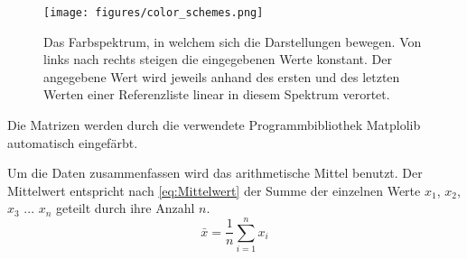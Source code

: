 \begin{figure}
    \centering
    \texttt{[image: figures/color\_schemes.png]}
    \caption{Das Farbspektrum, in welchem sich die Darstellungen bewegen. Von links nach rechts steigen die eingegebenen Werte konstant. Der angegebene Wert wird jeweils anhand des ersten und des letzten Werten einer Referenzliste linear in diesem Spektrum verortet.}
    \label{fig:color_schemes}
\end{figure}

Die Matrizen werden durch die verwendete Programmbibliothek \glqq{}Matplolib\grqq{} automatisch eingefärbt.


Um die Daten zusammenfassen wird das arithmetische Mittel benutzt. Der Mittelwert entspricht nach \autoref{eq:Mittelwert} der Summe der einzelnen Werte $x_1$, $x_2$, $x_3$ ... $x_n$ geteilt durch ihre Anzahl $n$.
\begin{equation}\label{eq:Mittelwert}
    \bar x = \frac{1}{n}\sum_{i=1}^n x_i
\end{equation}